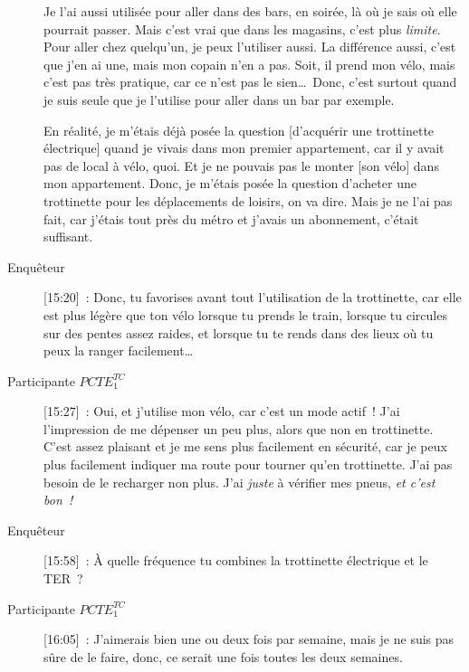 \begin{description}
    Je l’ai aussi utilisée pour aller dans des bars, en soirée, là où je sais où elle pourrait passer. Mais c’est vrai que dans les magasins, c’est plus \textsl{limite}. Pour aller chez quelqu’un, je peux l’utiliser aussi. La différence aussi, c’est que j’en ai une, mais mon copain n’en a pas. Soit, il prend mon vélo, mais c'est pas très pratique, car ce n’est pas le sien\dots~Donc, c’est surtout quand je suis seule que je l’utilise pour aller dans un bar par exemple.%
    
    En réalité, je m’étais déjà posée la question [d’acquérir une trottinette électrique] quand je vivais dans mon premier appartement, car il y avait pas de local à vélo, quoi. Et je ne pouvais pas le monter [son vélo] dans mon appartement. Donc, je m’étais posée la question d’acheter une trottinette pour les déplacements de loisirs, on va dire. Mais je ne l’ai pas fait, car j’étais tout près du métro et j’avais un abonnement, c’était suffisant. 
    \item[Enquêteur] [15:20]~: Donc, tu favorises avant tout l'utilisation de la trottinette, car elle est plus légère que ton vélo lorsque tu prends le train, lorsque tu circules sur des pentes assez raides, et lorsque tu te rends dans des lieux où tu peux la ranger facilement\dots
    \item[Participante \(PCTE^{TC}_{1}\)] [15:27]~: Oui, et j'utilise mon vélo, car c'est un mode actif~! J'ai l'impression de me dépenser un peu plus, alors que non en trottinette. C'est assez plaisant et je me sens plus facilement en sécurité, car je peux plus facilement indiquer ma route pour tourner qu'en trottinette. J'ai pas besoin de le recharger non plus. J'ai \textsl{juste} à vérifier mes pneus, \textsl{et c'est bon~!}
    \item[Enquêteur] [15:58]~: À quelle fréquence tu combines la trottinette électrique et le TER~?
    \item[Participante \(PCTE^{TC}_{1}\)] [16:05]~: J'aimerais bien une ou deux fois par semaine, mais je ne suis pas sûre de le faire, donc, ce serait une fois toutes les deux semaines.%


\end{description}
